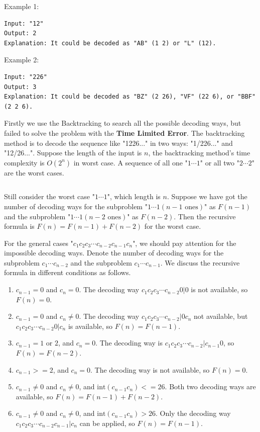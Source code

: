 \documentclass[11pt]{article}
\begin{document}
Example 1:
\begin{verbatim}
Input: "12"
Output: 2
Explanation: It could be decoded as "AB" (1 2) or "L" (12).
\end{verbatim}

Example 2:
\begin{verbatim}
Input: "226"
Output: 3
Explanation: It could be decoded as "BZ" (2 26), "VF" (22 6), or "BBF" (2 2 6).
\end{verbatim}

Firstly we use the Backtracking to search all the possible decoding ways, but failed to solve the problem with the \textbf{Time Limited Error}. 
The backtracking method is to decode the sequence like "1226..." in two ways: "1/226..." and "12/26...". 
Suppose the length of the input is $n$, the backtracking method's time complexity is $O(2^n)$ in worst case. 
A sequence of all one "$1 \cdots 1$" or all two "$2 \cdots 2$" are the worst cases. 

\inputminted[breaklines=true,frame=leftline, linenos=true]{python}{src/numDecodings.py}

Still consider the worst case "$1 \cdots 1$", which length is $n$. 
Suppose we have got the number of decoding ways for the subproblem "$1 \cdots 1 (n-1 \text{ ones})$" as $F(n-1)$ and the subproblem "$1 \cdots 1 (n-2 \text{ ones})$" as $F(n-2)$. 
Then the recursive formula is $F(n)=F(n-1)+F(n-2)$ for the worst case.

For the general cases "$c_1 c_2 c_3 \cdots c_{n-2} c_{n-1} c_{n}$", we should pay attention for the impossible decoding ways. 
Denote the number of decoding ways for the subproblem $c_1 \cdots c_{n-2}$ and the subproblem $c_1 \cdots c_{n-1}$.
We discuss the recursive formula in different conditions as follows.
\begin{enumerate}
	\item $c_{n-1}=0$ and $c_{n}=0$. The decoding way $c_1 c_2 c_3 \cdots c_{n-2}  0 | 0$ is not available, so $F(n)=0$.
	\item $c_{n-1}=0$ and $c_{n}\neq 0$. The decoding way $c_1 c_2 c_3 \cdots c_{n-2} | 0 c_{n}$ not available, but $c_1 c_2 c_3 \cdots c_{n-2}  0 | c_{n}$ is available, so $F(n)=F(n-1)$. 
	\item $c_{n-1}=1 \text{ or } 2$, and $c_{n}=0$. The decoding way is $c_1 c_2 c_3 \cdots c_{n-2}  | c_{n-1}  0$, so $F(n)=F(n-2)$.
	\item $c_{n-1}>=2$, and $c_{n}=0$. The decoding way is not available, so $F(n)=0$.
	\item $c_{n-1} \neq 0$ and $c_{n} \neq 0$, and $\text{int}(c_{n-1}c_{n})<=26$. Both two decoding ways are available, so $F(n)=F(n-1)+F(n-2)$.
	\item $c_{n-1} \neq 0$ and $c_{n} \neq 0$, and $\text{int}(c_{n-1}c_{n})>26$. Only the decoding way $c_1 c_2 c_3 \cdots c_{n-2} c_{n-1} | c_{n}$ can be applied, so $F(n)=F(n-1)$.
\end{enumerate}
\end{document}
